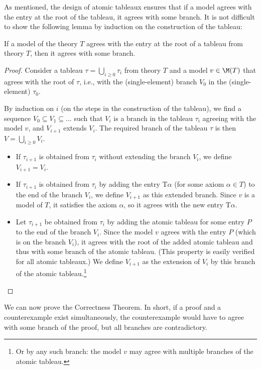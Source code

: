 As mentioned, the design of atomic tableaux ensures that if a model agrees with the entry at the root of the tableau, it agrees with some branch. It is not difficult to show the following lemma by induction on the construction of the tableau:
\begin{lemma}\label{lemma:agrees-with-branch}
    If a model of the theory $T$ agrees with the entry at the root of a tableau from theory $T$, then it agrees with some branch.
\end{lemma}
\begin{proof}
    Consider a tableau $\tau = \bigcup_{i \geq 0} \tau_i$ from theory $T$ and a model $v \in \M(T)$ that agrees with the root of $\tau$, i.e., with the (single-element) branch $V_0$ in the (single-element) $\tau_0$.
    
    By induction on $i$ (on the steps in the construction of the tableau), we find a sequence $V_0 \subseteq V_1 \subseteq \dots$ such that $V_i$ is a branch in the tableau $\tau_i$ agreeing with the model $v$, and $V_{i+1}$ extends $V_i$. The required branch of the tableau $\tau$ is then $V = \bigcup_{i \geq 0} V_i$.
    
    \begin{itemize}
        \item If $\tau_{i+1}$ is obtained from $\tau_i$ without extending the branch $V_i$, we define $V_{i+1} = V_i$.
        \item If $\tau_{i+1}$ is obtained from $\tau_i$ by adding the entry $\mathrm{T}\alpha$ (for some axiom $\alpha \in T$) to the end of the branch $V_i$, we define $V_{i+1}$ as this extended branch. Since $v$ is a model of $T$, it satisfies the axiom $\alpha$, so it agrees with the new entry $\mathrm{T}\alpha$.
        \item Let $\tau_{i+1}$ be obtained from $\tau_i$ by adding the atomic tableau for some entry $P$ to the end of the branch $V_i$. Since the model $v$ agrees with the entry $P$ (which is on the branch $V_i$), it agrees with the root of the added atomic tableau and thus with some branch of the atomic tableau. (This property is easily verified for all atomic tableaux.) We define $V_{i+1}$ as the extension of $V_i$ by this branch of the atomic tableau.\footnote{Or by any such branch: the model $v$ may agree with multiple branches of the atomic tableau.}
    \end{itemize}
\end{proof}

We can now prove the Correctness Theorem. In short, if a proof and a counterexample exist simultaneously, the counterexample would have to agree with some branch of the proof, but all branches are contradictory.

